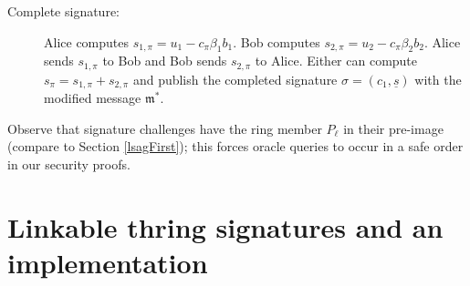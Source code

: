 \documentclass{iacrtrans}
\theoremstyle{definition}
\numberwithin{theorem}{subsection}
\numberwithin{lemma}{theorem}
\newcommand{\m}{\mathfrak{m}}
\begin{document}
\begin{description}
\item [Complete signature:] Alice computes $s_{1, \pi} = u_1 - c_\pi \beta_1 b_1$. Bob computes $s_{2, \pi} = u_2 - c_\pi \beta_2 b_2$. Alice sends $s_{1, \pi}$ to Bob and Bob sends $s_{2, \pi}$ to Alice.   Either can compute $s_\pi = s_{1, \pi} + s_{2, \pi}$ and publish the completed signature $\sigma = (c_1, \underline{s})$ with the modified message $\m^*$.
\end{description} Observe that signature challenges have the ring member $P_\ell$ in their pre-image (compare to Section \ref{lsagFirst}); this forces oracle queries to occur in a safe order in our security proofs.





\section{Linkable thring signatures and an  implementation}\label{schemeAndImp}

\end{document}
